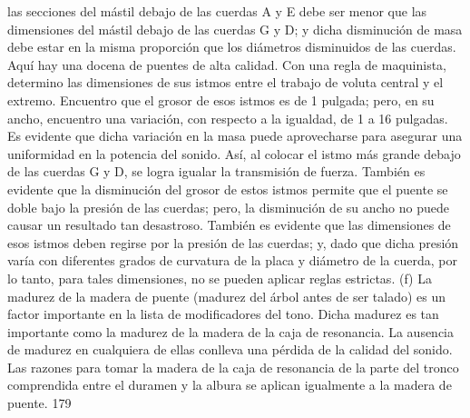 las secciones del mástil debajo de las cuerdas A y E
debe ser menor que las dimensiones del mástil debajo de las cuerdas G y D; y dicha disminución de masa debe estar en la misma proporción que los diámetros disminuidos de las cuerdas.
Aquí hay una docena de puentes de alta calidad. Con una regla de maquinista, determino las dimensiones de sus istmos entre el trabajo de voluta central y el extremo. Encuentro que el grosor de esos istmos es de 1 pulgada; pero, en su ancho, encuentro una variación, con respecto a la igualdad, de 1 a 16 pulgadas. Es evidente que dicha variación en la masa puede aprovecharse para asegurar una uniformidad en la potencia del sonido. Así, al colocar el istmo más grande debajo de las cuerdas G y D, se logra igualar la transmisión de fuerza. También es evidente que la disminución del grosor de estos istmos permite que el puente se doble bajo la presión de las cuerdas; pero, la disminución de su ancho no puede causar un resultado tan desastroso. También es evidente que las dimensiones de esos istmos deben regirse por la presión de las cuerdas; y, dado que dicha presión varía con diferentes grados de curvatura de la placa y diámetro de la cuerda, por lo tanto, para tales dimensiones, no se pueden aplicar reglas estrictas.
(f) La madurez de la madera de puente (madurez del árbol antes de ser talado) es un factor importante en la lista de modificadores del tono. Dicha madurez es tan importante como la madurez de la madera de la caja de resonancia. La ausencia de madurez en cualquiera de ellas conlleva una pérdida de la calidad del sonido. Las razones para tomar la madera de la caja de resonancia de la parte del tronco comprendida entre el duramen y la albura se aplican igualmente a la madera de puente. 179
